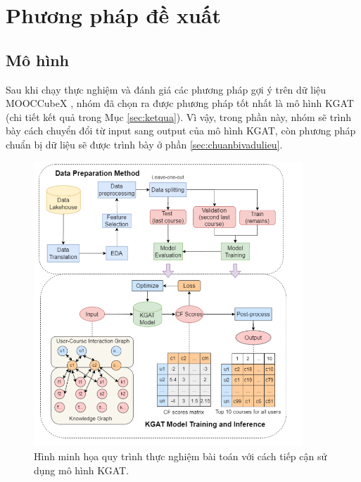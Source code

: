 \section{Phương pháp đề xuất}
\subsection{Mô hình}
Sau khi chạy thực nghiệm và đánh giá các phương pháp gợi ý trên dữ liệu MOOCCubeX \cite{mooccubex}, nhóm đã chọn ra được phương pháp tốt nhất là mô hình KGAT (chi tiết kết quả trong Mục \ref{sec:ketqua}). Vì vậy, trong phần này, nhóm sẽ trình bày cách chuyển đổi từ input sang output của mô hình KGAT, còn phương pháp chuẩn bị dữ liệu sẽ được trình bày ở phần \ref{sec:chuanbivadulieu}.

\begin{figure}[H]
    \centering
    \includegraphics[width=0.9\textwidth]{figures/69.png}
    \caption{Hình minh họa quy trình thực nghiệm bài toán với cách tiếp cận sử dụng mô hình KGAT.}
    \label{fig:hinh4_1}
\end{figure}

